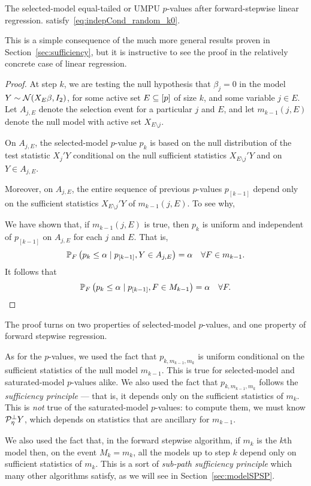 \documentclass{article}
\begin{document}
\begin{proposition}
  The selected-model equal-tailed or UMPU $p$-values after forward-stepwise linear regression. satisfy~\eqref{eq:indepCond_random_k0}.
\end{proposition}
This is a simple consequence of the much more general results proven in Section~\ref{sec:sufficiency}, but it is instructive to see the proof in the relatively concrete case of linear regression.
\begin{proof}
  At step $k$, we are testing the null hypothesis that $\beta_j=0$ in     the model $Y\sim \cN(X_E\beta, I_2)$, for some active set $E\sub [p]$ of size $k$, and some variable $j\in E$. Let $A_{j,E}$ denote the selection event for a particular $j$ and $E$, and let $m_{k-1}(j,E)$ denote the null model with active set $X_{E\setminus j}$.

On $A_{j, E}$, the selected-model $p$-value $p_k$ is based on the null distribution of the test statistic $X_j'Y$ conditional on the null sufficient statistics $X_{E\setminus j}'Y$ and on $Y \in A_{j,E}$.

Moreover, on $A_{j,E}$, the entire sequence of previous $p$-values $p_{[k-1]}$ depend only on the sufficient statistics $X_{E\setminus j}'Y$ of $m_{k-1}(j,E)$. To see why, 

We have shown that, if $m_{k-1}(j,E)$ is true, then $p_k$ is uniform and independent of $p_{[k-1]}$ on $A_{j,E}$ for each $j$ and $E$. That is,
\[
\P_F\left(p_{k} \leq \alpha \mid p_{[k-1]}, Y \in A_{j,E} \right) = \alpha \quad \forall F \in m_{k-1}.
\]
It follows that 
\[
\P_F\left(p_{k} \leq \alpha \mid p_{[k-1]}, F \in M_{k-1} \right) = \alpha \quad \forall F.
\]
\end{proof}
The proof turns on two properties of selected-model $p$-values, and one property of forward stepwise regression. 

As for the $p$-values, we used the fact that $p_{k,m_{k-1},m_k}$ is uniform conditional on the sufficient statistics of the null model $m_{k-1}$. This is true for selected-model and saturated-model $p$-values alike. We also used the fact that $p_{k,m_{k-1},m_k}$ follows the {\em sufficiency principle} --- that is, it depends only on the sufficient statistics of $m_k$. This is {\em not} true of the saturated-model $p$-values: to compute them, we must know $\proj_{\eta}^\perp Y$, which depends on statistics that are ancillary for $m_{k-1}$.

We also used the fact that, in the forward stepwise algorithm, if $m_k$ is the $k$th model then, on the event $M_k=m_k$, all the models up to step $k$ depend only on sufficient statistics of $m_k$. This is a sort of {\em sub-path sufficiency principle} which many other algorithms satisfy, as we will see in Section~\ref{sec:modelSPSP}.
\end{document}
